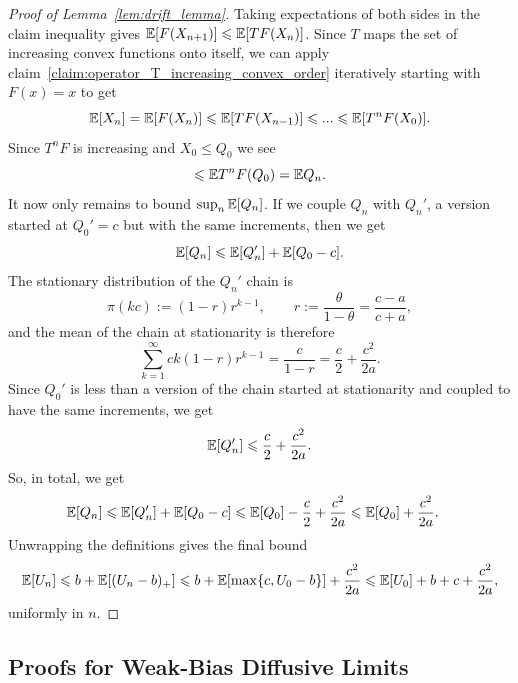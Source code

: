 \begin{subappendices}
\begin{proof}[Proof of Lemma~\ref{lem:drift_lemma}]
     Taking expectations of both sides in the claim inequality gives $\mathbb{E}[F(X_{n+1})] \leqslant \mathbb{E}[TF(X_n)]$. Since $T$ maps the set of increasing convex functions onto itself, we can apply claim~\eqref{claim:operator_T_increasing_convex_order} iteratively starting with $F(x) = x$ to get
    \begin{equation*}
        \mathbb{E}[X_n] = \mathbb{E}[F(X_n)] \leqslant \mathbb{E}[TF(X_{n-1})] \leqslant ... \leqslant \mathbb{E}[T^nF(X_0)].
    \end{equation*}
    \noindent Since $T^nF$ is increasing and $X_0 \leq Q_0$ we see
        \[\leqslant \mathbb{E} T^n F(Q_0) = \mathbb{E} Q_n.\]
    It now only remains to bound $\sup_n \mathbb{E}[Q_n]$. If we couple $Q_n$ with $Q_n'$, a version started at $Q_0' = c$ but with the same increments, then we get
    $$\mathbb{E}[Q_n] \leqslant \mathbb{E}[Q_n'] + \mathbb{E}[Q_0 - c].$$
    The stationary distribution of the $Q_n'$ chain is
    $$\pi(kc) := (1-r)r^{k-1}, \qquad r := \frac{\theta}{1-\theta} = \frac{c-a}{c+a},$$
    and the mean of the chain at stationarity is therefore
    \begin{equation*}
        \sum_{k=1}^\infty ck(1-r)r^{k-1} = \frac{c}{1-r} = \frac{c}{2} + \frac{c^2}{2a}.
    \end{equation*}
    Since $Q_0'$ is less than a version of the chain started at stationarity and coupled to have the same increments, we get
    $$\mathbb{E}[Q_n'] \leqslant \frac{c}{2} + \frac{c^2}{2a}.$$
    So, in total, we get
    \begin{align*}
        \mathbb{E}[Q_n] &\leqslant \mathbb{E}[Q_n'] + \mathbb{E}[Q_0 - c] \leqslant \mathbb{E}[Q_0] - \frac{c}{2} + \frac{c^2}{2a} \leqslant \mathbb{E}[Q_0] + \frac{c^2}{2a}.
    \end{align*}
    Unwrapping the definitions gives the final bound
    $$\mathbb{E}[U_n] \leqslant b + \mathbb{E}[(U_n - b)_+] \leqslant b + \mathbb{E}[\max\{c,U_0-b\}] + \frac{c^2}{2a} \leqslant \mathbb{E}[U_0] + b + c + \frac{c^2}{2a},$$
    uniformly in $n$.
\end{proof}

\newpage
\subsection{Proofs for Weak-Bias Diffusive Limits}
\label{appendix:diffusion_limit_proofs}




\end{subappendices}
